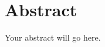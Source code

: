 \documentclass[\main/main.tex]{subfiles}
\begin{document}
\chapter*{Abstract}
Your abstract will go here.
\end{document}

